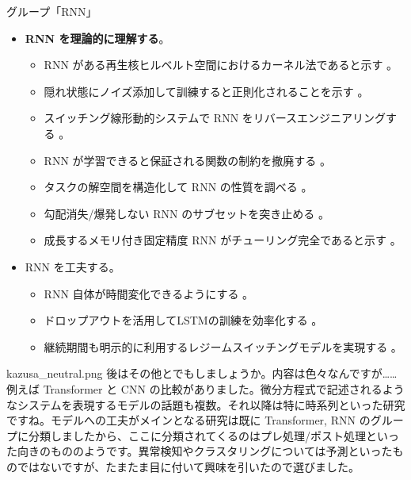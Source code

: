 \documentclass[b5paper,xelatex,ja=standard,10pt]{bxjsarticle}
\begin{document}
\vspace{1pt}
\begin{PROP}[left=0pt]{グループ「RNN」}
\begin{itemize}
  \item \textbf{RNN を理論的に理解する}。
  \begin{itemize}
    \item RNN がある再生核ヒルベルト空間におけるカーネル法であると示す \cite{AdelineFermanian2021}。
    \item 隠れ状態にノイズ添加して訓練すると正則化されることを示す \cite{SoonHoeLim2021}。
    \item スイッチング線形動的システムで RNN をリバースエンジニアリングする \cite{JimmySmith2021}。
    \item RNN が学習できると保証される関数の制約を撤廃する \cite{LifuWang2021} \cite{AbhishekPanigrahi2021}。
    \item タスクの解空間を構造化して RNN の性質を調べる \cite{EliaTurner2021}。
    \item 勾配消失/爆発しない RNN のサブセットを突き止める \cite{ZimingZhang2021}。
    \item 成長するメモリ付き固定精度 RNN がチューリング完全であると示す \cite{StephenChung2021}。
  \end{itemize}
  \vspace{6pt}
  \item RNN を工夫する。
  \begin{itemize}
    \item RNN 自体が時間変化できるようにする \cite{AstonZhang2021}。
    \item ドロップアウトを活用してLSTMの訓練を効率化する \cite{AnupSarma2021}。
    \item 継続期間も明示的に利用するレジームスイッチングモデルを実現する \cite{AbdulFatirAnsari2021}。
  \end{itemize}
\end{itemize}
\end{PROP}
\vspace{1pt}

\begin{SERIFU}[colback=PaleIris, colbacktitle=PaleIris2]{kazusa_neutral.png}
後はその他とでもしましょうか。内容は色々なんですが……例えば Transformer と CNN の比較がありました。微分方程式で記述されるようなシステムを表現するモデルの話題も複数。それ以降は特に時系列といった研究ですね。モデルへの工夫がメインとなる研究は既に Transformer, RNN のグループに分類しましたから、ここに分類されてくるのはプレ処理/ポスト処理といった向きのもののようです。異常検知やクラスタリングについては予測といったものではないですが、たまたま目に付いて興味を引いたので選びました。
\end{SERIFU}
\end{document}
